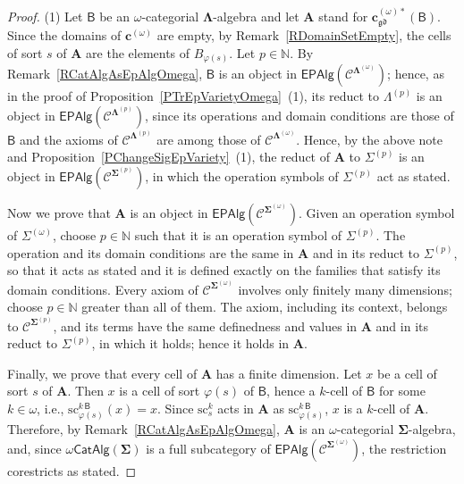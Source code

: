 \documentclass[a4paper, reqno]{amsbook}
\newcommand{\sig}[1]{\mathbf{#1}}             %
\newcommand{\calg}[1]{\boldsymbol{\mathsf{#1}}} %
\newcommand{\spec}[1]{\boldsymbol{\mathcal{#1}}} %
\newcommand{\gd}{\mathfrak{gd}}              %
\newcommand{\src}{\mathrm{sc}}
\theoremstyle{plain}
\theoremstyle{definition}
\begin{document}
\begin{proof}
(1) Let $\calg{B}$ be an $\omega$-categorial $\sig{\Lambda}$-algebra and let $\mathbf{A}$ stand for $\mathbf{c}^{(\omega)\ast}_{\gd}(\calg{B})$.
Since the domains of $\mathbf{c}^{(\omega)}$ are empty, by Remark~\ref{RDomainSetEmpty}, the cells of sort $s$ of $\mathbf{A}$ are the elements of $B_{\varphi(s)}$.
Let $p\in\mathbb{N}$.
By Remark~\ref{RCatAlgAsEpAlgOmega}, $\calg{B}$ is an object in $\mathsf{EPAlg}(\spec{C}^{\sig{\Lambda}^{(\omega)}})$; hence, as in the proof of Proposition~\ref{PTrEpVarietyOmega}~(1), its reduct to $\Lambda^{(p)}$ is an object in $\mathsf{EPAlg}(\spec{C}^{\sig{\Lambda}^{(p)}})$, since its operations and domain conditions are those of $\calg{B}$ and the axioms of $\spec{C}^{\sig{\Lambda}^{(p)}}$ are among those of $\spec{C}^{\sig{\Lambda}^{(\omega)}}$.
Hence, by the above note and Proposition~\ref{PChangeSigEpVariety}~(1), the reduct of $\mathbf{A}$ to $\Sigma^{(p)}$ is an object in $\mathsf{EPAlg}(\spec{C}^{\sig{\Sigma}^{(p)}})$, in which the operation symbols of $\Sigma^{(p)}$ act as stated.

Now we prove that $\mathbf{A}$ is an object in $\mathsf{EPAlg}(\spec{C}^{\sig{\Sigma}^{(\omega)}})$.
Given an operation symbol of $\Sigma^{(\omega)}$, choose $p\in\mathbb{N}$ such that it is an operation symbol of $\Sigma^{(p)}$.
The operation and its domain conditions are the same in $\mathbf{A}$ and in its reduct to $\Sigma^{(p)}$, so that it acts as stated and it is defined exactly on the families that satisfy its domain conditions.
Every axiom of $\spec{C}^{\sig{\Sigma}^{(\omega)}}$ involves only finitely many dimensions; choose $p\in\mathbb{N}$ greater than all of them.
The axiom, including its context, belongs to $\spec{C}^{\sig{\Sigma}^{(p)}}$, and its terms have the same definedness and values in $\mathbf{A}$ and in its reduct to $\Sigma^{(p)}$, in which it holds; hence it holds in $\mathbf{A}$.

Finally, we prove that every cell of $\mathbf{A}$ has a finite dimension.
Let $x$ be a cell of sort $s$ of $\mathbf{A}$.
Then $x$ is a cell of sort $\varphi(s)$ of $\calg{B}$, hence a $k$-cell of $\calg{B}$ for some $k\in\omega$, i.e., $\src^{k\,\calg{B}}_{\varphi(s)}(x)=x$.
Since $\src^{k}_{s}$ acts in $\mathbf{A}$ as $\src^{k\,\calg{B}}_{\varphi(s)}$, $x$ is a $k$-cell of $\mathbf{A}$.
Therefore, by Remark~\ref{RCatAlgAsEpAlgOmega}, $\mathbf{A}$ is an $\omega$-categorial $\sig{\Sigma}$-algebra, and, since $\omega\mathsf{CatAlg}(\sig{\Sigma})$ is a full subcategory of $\mathsf{EPAlg}(\spec{C}^{\sig{\Sigma}^{(\omega)}})$, the restriction corestricts as stated.


\end{proof}
\end{document}
